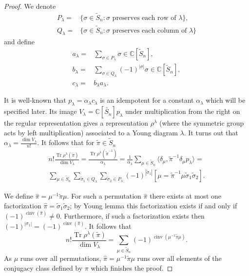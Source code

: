 \documentclass[12pt]{amsart}
\theoremstyle{plain}
\theoremstyle{remark}
\newcommand{\C}{\mathbb{C}}
\newcommand{\Sy}{\tilde{S}}
\DeclareMathOperator{\Tr}{Tr}
\DeclareMathOperator{\inv}{cinv}
\DeclareMathOperator{\dimm}{dim}
\begin{document}
\begin{proof}
We denote 
\begin{align*} 
P_{\lambda}=& \{\sigma\in \Sy_n \colon \sigma \text{ preserves each row
of }\lambda \}, \\
Q_{\lambda}=& \{\sigma\in \Sy_n \colon \sigma \text{ preserves each column
of }\lambda \}
\end{align*}
and define
\begin{align*} 
a_{\lambda} = & \sum_{\sigma\in P_{\lambda}} \sigma \in \C[\Sy_n],\\
b_{\lambda} = & \sum_{\sigma\in Q_{\lambda}} (-1)^{|\sigma|} \sigma \in \C[\Sy_n],\\
c_{\lambda} = &  b_{\lambda} a_{\lambda}.
\end{align*} 


It is well-known that $p_{\lambda}=\alpha_{\lambda} c_{\lambda}$ is an idempotent
for a constant $\alpha_\lambda$ which will be specified later. Its image 
$V_{\lambda} = \C[\tilde{S_n}] p_{\lambda}$ under multiplication from the right
on the regular representation  gives a representation
$\rho^{\lambda}$ (where the symmetric group acts by left multiplication)
 associated to a Young diagram $\lambda$. It turns out that
$\alpha_{\lambda}=\frac{\dimm V_{\lambda}}{n!}$.
It follows that
for $\tilde{\pi}\in \Sy_n$
\begin{multline}
\label{eq:charakter-babab} 
n! \frac{\Tr \rho^{\lambda}(\tilde{\pi})}{\dimm V_{\lambda}}
= \frac{\Tr \rho^{\lambda}(\tilde{\pi}^{-1})}{\alpha_{\lambda}} = 
\frac{1}{\alpha_{\lambda}} \sum_{\mu\in \Sy_n} 
 \langle \delta_{\mu}, \tilde{\pi}^{-1} \delta_\mu p_{\lambda}\rangle
= \\
\sum_{\mu\in \Sy_n} \sum_{\tilde{\sigma}_1\in Q_{\lambda}} 
\sum_{\tilde{\sigma}_2\in P_{\lambda}}
(-1)^{|\tilde{\sigma}_1|} [\mu =\tilde{\pi}^{-1} \mu \tilde{\sigma}_1 \tilde{\sigma}_2].
\end{multline}

We define $\hat{\pi}=\mu^{-1} \tilde{\pi} \mu$.
For such a permutation $\hat{\pi}$ there exists at most one factorization
$\hat{\pi}=\tilde{\sigma}_1 \tilde{\sigma}_2$; by Young lemma this factorization exists
if and only if $(-1)^{\inv(\hat{\pi})}\neq 0$. Furthermore, if such a factorization
exists then $(-1)^{|\sigma_1|}=(-1)^{\inv(\hat{\pi})}$. It follows that
$$ n! \frac{\Tr \rho^{\lambda}(\tilde{\pi})}{\dimm V_{\lambda}}=
\sum_{\mu\in \Sy_n} 
(-1)^{\inv(\mu^{-1} \tilde{\pi} \mu)}. $$
As $\mu$ runs over all permutations,
$\hat{\pi}=\mu^{-1} \tilde{\pi} \mu$ runs over all elements of the conjugacy class defined by $\pi$
which finishes the proof.
% 
% 
\end{proof}
\end{document}
